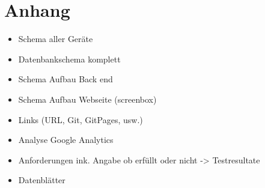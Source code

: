 \section*{Anhang}

\begin{itemize}
	\item Schema aller Geräte
	\item  Datenbankschema komplett
	\item Schema Aufbau Back end
	\item  Schema Aufbau Webseite (screenbox)
	\item Links (URL, Git, GitPages, usw.)
	\item Analyse Google Analytics
	\item Anforderungen ink. Angabe ob erfüllt oder nicht -> Testresultate
	\item  Datenblätter
\end{itemize}
